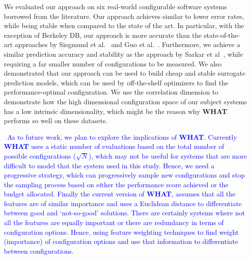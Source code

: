 \documentclass[smallextended]{svjour3}       %
\newcommand{\respto}[1]{
    \fcolorbox{black}{black!15}{
    \label{response:#1}
    \textbf{R-{#1}}}
}
\newcommand{\tion}[1]{\S\ref{sect:#1}}
\newcommand{\what}{{\bf WHAT}\xspace}
\begin{document}
We evaluated our approach on six real-world configurable software systems borrowed from the
literature. Our approach achieves similar to lower error rates, while being stable when
compared to the state of the art. In particular, with the exception of Berkeley DB, our
approach is more accurate than the state-of-the-art approaches by Siegmund et
al.~\cite{siegmund2012predicting} and Guo et al.~\cite{guo2013variability}. Furthermore, we
achieve a similar prediction accuracy and stability as the approach by Sarkar et
al~\cite{sarkar2015cost}, while requiring a far smaller number of configurations to be
measured. We also demonstrated that our approach can be used to build cheap and stable
surrogate prediction models, which can be used by off-the-shelf optimizers to find the
performance-optimal configuration.  We use the correlation dimension to demonstrate how the high dimensional configuration space of our subject systems has a low intrinsic dimensionality, which might be the reason why \what performs so well on these datasets. 

\respto{2f}~\textcolor{blue}{As to future work, we plan to explore the implications of \what{}. Currently \what{} uses a static number of evaluations based on the total number of possible configurations ($\sqrt{N}$), which may not be useful for systems that are more difficult to model that the system used in this study. Hence, we need a progressive strategy, which can progressively sample new configurations and stop the sampling process based on either the performance score achieved or the budget allocated. Finally the current version of \what{}, assumes that all the features are of similar importance and uses a Euclidean distance to differentiate between good and `not-so-good' solutions. There are certainly systems where not all the features are equally important or there are redundancy in terms of configuration options. Hence, using feature weighting techniques to find weight (importance) of configuration options and use that information to differentiate between configurations.}





\end{document}
